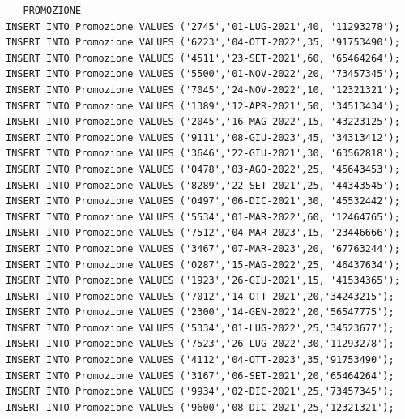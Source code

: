 \documentclass[12pt]{report}
\begin{document}
\begin{scriptsize}
\begin{verbatim}
-- PROMOZIONE
INSERT INTO Promozione VALUES ('2745','01-LUG-2021',40, '11293278');
INSERT INTO Promozione VALUES ('6223','04-OTT-2022',35, '91753490');
INSERT INTO Promozione VALUES ('4511','23-SET-2021',60, '65464264');
INSERT INTO Promozione VALUES ('5500','01-NOV-2022',20, '73457345');
INSERT INTO Promozione VALUES ('7045','24-NOV-2022',10, '12321321');
INSERT INTO Promozione VALUES ('1389','12-APR-2021',50, '34513434');
INSERT INTO Promozione VALUES ('2045','16-MAG-2022',15, '43223125');
INSERT INTO Promozione VALUES ('9111','08-GIU-2023',45, '34313412');
INSERT INTO Promozione VALUES ('3646','22-GIU-2021',30, '63562818');
INSERT INTO Promozione VALUES ('0478','03-AGO-2022',25, '45643453');
INSERT INTO Promozione VALUES ('8289','22-SET-2021',25, '44343545');
INSERT INTO Promozione VALUES ('0497','06-DIC-2021',30, '45532442');
INSERT INTO Promozione VALUES ('5534','01-MAR-2022',60, '12464765');
INSERT INTO Promozione VALUES ('7512','04-MAR-2023',15, '23446666');
INSERT INTO Promozione VALUES ('3467','07-MAR-2023',20, '67763244');
INSERT INTO Promozione VALUES ('0287','15-MAG-2022',25, '46437634');
INSERT INTO Promozione VALUES ('1923','26-GIU-2021',15, '41534365');
INSERT INTO Promozione VALUES ('7012','14-OTT-2021',20,'34243215');
INSERT INTO Promozione VALUES ('2300','14-GEN-2022',20,'56547775');
INSERT INTO Promozione VALUES ('5334','01-LUG-2022',25,'34523677');
INSERT INTO Promozione VALUES ('7523','26-LUG-2022',30,'11293278');
INSERT INTO Promozione VALUES ('4112','04-OTT-2023',35,'91753490');
INSERT INTO Promozione VALUES ('3167','06-SET-2021',20,'65464264');
INSERT INTO Promozione VALUES ('9934','02-DIC-2021',25,'73457345');
INSERT INTO Promozione VALUES ('9600','08-DIC-2021',25,'12321321');


\end{verbatim}
\end{scriptsize}
\end{document}

